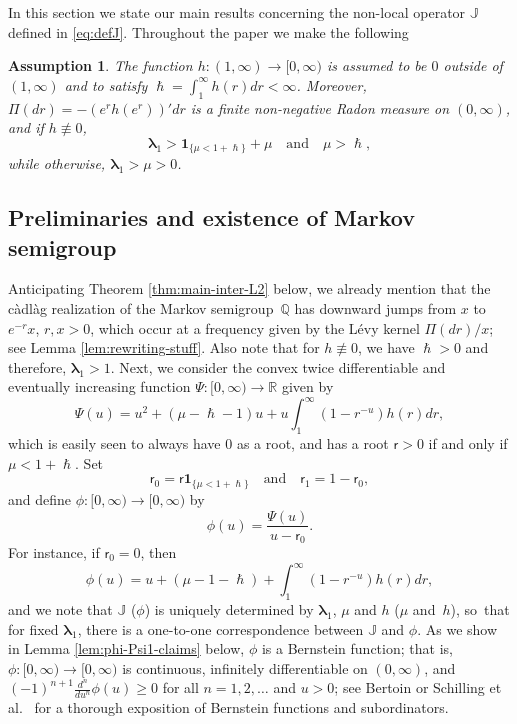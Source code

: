 \documentclass[10pt]{amsart}
\theoremstyle{plain}
\newtheorem{assmp}{Assumption}
\theoremstyle{definition}
\newcommand{\R}{\mathbb{R}}
\newcommand{\J}{\mathds{Q}}
\newcommand{\calJ}{\mathds{J}}
\newcommand{\lam}{{\bm{\lambda}_1}}
\newcommand{\tet}{{\mathsf{r}_0}}
\newcommand{\vat}{{\mathsf{r}_1}}
\let\h\hslash
\let\mo\mu
\begin{document}
In this section we state our main results concerning the non-local operator $\calJ$ defined in \eqref{eq:defJ}.
Throughout the paper we make the following
\begin{assmp}
\label{assA}
The function $h \colon (1,\infty)\!\to\![0,\infty)$ is assumed to be $0$ outside of~$(1,\infty)$ and to satisfy
$\h = \int_1^\infty h(r)dr < \infty$. Moreover, $\Pi(dr) = -(e^rh(e^r))'dr$ is a finite non-negative Radon
measure on $(0,\infty)$, and if $h \not\equiv 0$,
\begin{equation*}
\lam > \bm{1}_{\{\mo < 1+\h\}} + \mo \quad \text{and} \quad \mo > \h,
\end{equation*}
while otherwise, $\lam > \mo > 0$.
\end{assmp}

\subsection{Preliminaries and existence of Markov semigroup}

Anticipating Theorem \ref{thm:main-inter-L2} below, we already mention that the càdlàg realization of the Markov semigroup~$\J$ has downward jumps from $x$ to $e^{-r}x$, $r,x > 0$, which occur at a frequency given by the Lévy kernel $\Pi(dr)/x$; see Lemma \ref{lem:rewriting-stuff}. Also note that for $h \not\equiv 0$, we have $\h >0$ and therefore, $\lam >1$. Next, we consider the convex twice differentiable and eventually increasing function $\Psi \colon [0,\infty) \to \R$ given by
\begin{equation}
\label{eq:defpsi}
\Psi(u) = u^2 + (\mo-\h-1)u + u \int_1^\infty (1-r^{-u})h(r)dr,
\end{equation}
which is easily seen to always have 0 as a root, and has a root $\mathsf{r} > 0$ if and only if $\mo < 1 + \h$. Set
\begin{equation}
\label{eq:def-root}
\tet = \mathsf{r}\bm{1}_{\{\mo < 1+\h\}} \quad \text{and} \quad \vat = 1-\tet,
\end{equation}
and define $\phi \colon [0,\infty) \to [0,\infty)$ by
\begin{equation}
\label{eq:def-phi}
\phi(u) = \frac{\Psi(u)}{u-\tet}.
\end{equation}
For instance, if $\tet = 0$, then
\begin{equation*}
\phi(u) = u + (\mo-1-\h) + \int_1^\infty (1-r^{-u})h(r)dr,
\end{equation*}
and we note that $\calJ$ (\resp $\phi$) is uniquely determined by $\lam$, $\mo$ and $h$ (\resp $\mo$ and~$h$), so~that for fixed $\lam$, there is a one-to-one correspondence between $\calJ$ and $\phi$. As we show in Lemma \ref{lem:phi-Psi1-claims} below, $\phi$ is a Bernstein function; that is, $\phi \colon [0,\infty) \to [0,\infty)$ is continuous, infinitely differentiable on $(0, \infty)$, and $(-1)^{n+1}\frac{d^n }{du^n}\phi(u)\geq 0$ for all $n = 1,2,\ldots$ and $u > 0$; see Bertoin \cite{Bertoin-s} or Schilling et al.~\cite{SchillingSongVondracek10} for a thorough exposition of Bernstein functions and subordinators.
\end{document}

